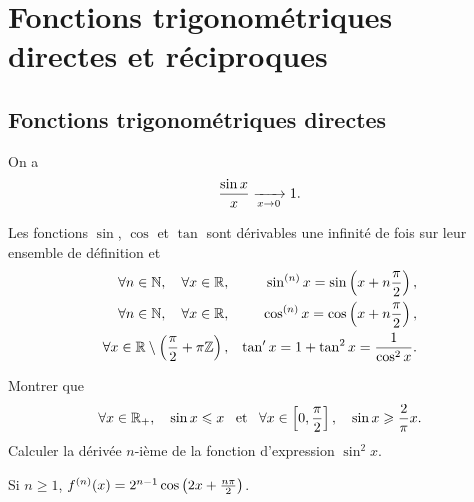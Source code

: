 \documentclass{magnolia}
\begin{document}
\section{Fonctions trigonométriques directes et réciproques}
\subsection{Fonctions trigonométriques directes}

\begin{proposition}
On a
\[\frac{\sin x}{x}\xrightarrow[x\rightarrow 0]{}1.\]
\end{proposition}

\begin{proposition}[utile=-3]
Les fonctions $\sin$, $\cos$ et $\tan$ sont dérivables une infinité de fois sur leur ensemble
de définition et
\begin{eqnarray*}
\forall n\in\mathbb{N} ,\quad \forall x\in\mathbb{R}, & &
  \sin^{(n)} x=\sin\left(x+n\frac{\pi}{2}\right),\\
\forall n\in\mathbb{N} ,\quad \forall x\in\mathbb{R}, & &
  \cos^{(n)} x=\cos\left(x+n\frac{\pi}{2}\right),\\
\forall x\in\mathbb{R}\setminus\left(\frac{\pi}{2}+\pi\mathbb{Z}\right), & &
  \tan' x=1+\tan^2 x=\frac{1}{\cos^2 x}.
\end{eqnarray*}
\end{proposition}

\begin{exos}
\exemple Montrer que
  \[\forall x\in\mathbb{R}_+ ,\quad \sin x\leqslant x \quad\!\text{et}\quad\!
    \forall x\in\left[0,\frac{\pi}{2}\right] ,\quad
    \sin x \geqslant \frac{2}{\pi}x.\]
\exemple Calculer la dérivée $n$-ième de la fonction d'expression $\sin^2 x$.
  \begin{sol}
  Si $n\geq 1$, $f^{(n)}(x)=2^{n-1}\cos\left(2x+\frac{n\pi}{2}\right)$.
  \end{sol}
\end{exos}

\end{document}
